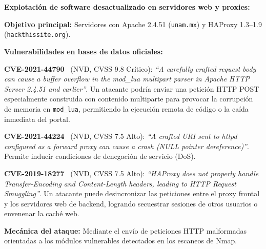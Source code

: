 \begin{enumerateColor}
    \item \textbf{Explotación de software desactualizado en servidores web y proxies:}
    \begin{itemizeColor}
        \item \textbf{Objetivo principal:} Servidores con Apache 2.4.51 (\texttt{unam.mx}) y HAProxy 1.3--1.9 (\texttt{hackthissite.org}).
        \item \textbf{Vulnerabilidades en bases de datos oficiales:}
        \begin{itemizeColor}
            \item \textbf{CVE-2021-44790}~\cite{cve_2021_44790} (NVD, CVSS 9.8 Crítico): \textit{``A carefully crafted request body can cause a buffer overflow in the mod\_lua multipart parser in Apache HTTP Server 2.4.51 and earlier''}. Un atacante podría enviar una petición HTTP POST especialmente construida con contenido multiparte para provocar la corrupción de memoria en \texttt{mod\_lua}, permitiendo la ejecución remota de código o la caída inmediata del portal.
            \item \textbf{CVE-2021-44224}~\cite{cve_2021_44224} (NVD, CVSS 7.5 Alto): \textit{``A crafted URI sent to httpd configured as a forward proxy can cause a crash (NULL pointer dereference)''}. Permite inducir condiciones de denegación de servicio (DoS).
            \item \textbf{CVE-2019-18277}~\cite{cve_2019_18277} (NVD, CVSS 7.5 Alto): \textit{``HAProxy does not properly handle Transfer-Encoding and Content-Length headers, leading to HTTP Request Smuggling''}. Un atacante puede desincronizar las peticiones entre el proxy frontal y los servidores web de backend, logrando secuestrar sesiones de otros usuarios o envenenar la caché web.
        \end{itemizeColor}
        \item \textbf{Mecánica del ataque:} Mediante el envío de peticiones HTTP malformadas orientadas a los módulos vulnerables detectados en los escaneos de Nmap.
    \end{itemizeColor}


\end{enumerateColor}
